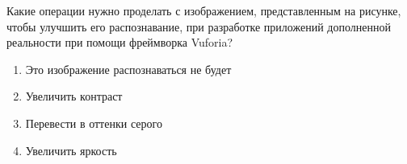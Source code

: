 
Какие операции нужно проделать с изображением, представленным на рисунке, чтобы улучшить его распознавание, при разработке приложений дополненной реальности при помощи фреймворка Vuforia? 


\begin{enumerate}
    \item Это изображение распознаваться не будет
    \item Увеличить контраст
    \item Перевести в оттенки серого
    \item Увеличить яркость
\end{enumerate}